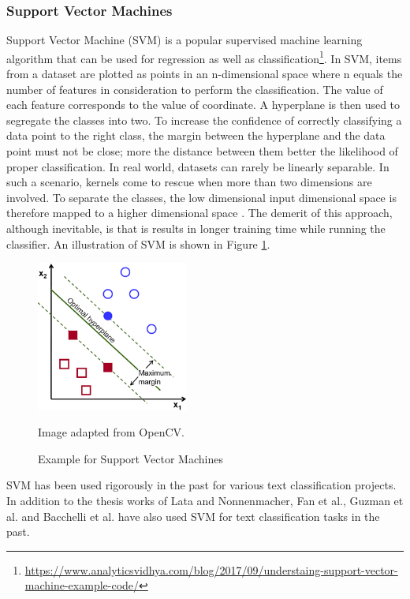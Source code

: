 \documentclass[a4paper,12pt,twoside]{report}
\begin{document}
\subsubsection{Support Vector Machines}
Support Vector Machine (SVM) is a popular supervised machine learning algorithm that can be used for regression as well as classification\footnote{\url{https://www.analyticsvidhya.com/blog/2017/09/understaing-support-vector-machine-example-code/}}. In SVM, items from a dataset are plotted as points in an n-dimensional space where n equals the number of features in consideration to perform the classification. The value of each feature corresponds to the value of coordinate. A hyperplane is then used to segregate the classes into two. To increase the confidence of correctly classifying a data point to the right class, the margin between the hyperplane and the data point must not be close; more the distance between them better the likelihood of proper classification\cite{Joachims1998a}.  
\bigbreak
In real world, datasets can rarely be linearly separable. In such a scenario, kernels come to rescue when more than two dimensions are involved. To separate the classes, the low dimensional input dimensional space is therefore mapped to a higher dimensional space \cite{Tong2001}. The demerit of this approach, although inevitable, is that is results in longer training time while running the classifier. An illustration of SVM is shown in Figure \ref{fig:svm}. 
\begin{figure}[h] %
    \centering
    \includegraphics[width=5cm]{optimal-hyperplane}
    \caption{Example for Support Vector Machines}
    \small Image adapted from OpenCV\footnotemark.
    \label{fig:svm}
\end{figure}
\bigbreak
SVM has been used rigorously in the past for various text classification projects. In addition to the thesis works of Lata \cite{Lata2016} and Nonnenmacher\cite{Nonnenmacher2017}, Fan et al.\cite{Fan2017}, Guzman et al.\cite{Guzman2016} and Bacchelli et al.\cite{Bacchelli2012} have also used SVM for text classification tasks in the past. 
\end{document}
